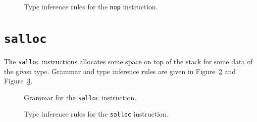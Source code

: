 \begin{figure}[H]
  \centering


  \caption{Type inference rules for the \texttt{nop} instruction.}
  \label{fig:nstar-instructionset-nop-typerules}
\end{figure}

\section{\texttt{salloc}}\label{sec:nstar-instructionset-salloc}

The \texttt{salloc} instructions allocates some space on top of the stack for some data of the given type.
Grammar and type inference rules are given in Figure~\ref{fig:nstar-instructionset-salloc-grammar} and Figure~\ref{fig:nstar-instructionset-salloc-typerules}.

\begin{figure}[H]
  \centering


  \caption{Grammar for the \texttt{salloc} instruction.}
  \label{fig:nstar-instructionset-salloc-grammar}
\end{figure}

\begin{figure}[H]
  \centering


  \caption{Type inference rules for the \texttt{salloc} instruction.}
  \label{fig:nstar-instructionset-salloc-typerules}
\end{figure}


